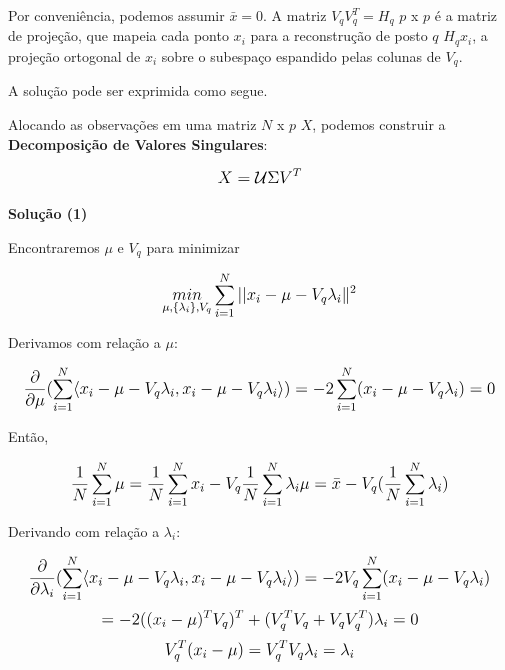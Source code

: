 \documentclass{article}
\begin{document}
Por conveniência, podemos assumir $\bar{x} = 0 $. A matriz $V_q V_q^T = H_q$ $p$ x $p$ é a matriz de projeção, que mapeia cada ponto $x_i$ para a reconstrução de posto $q$ $H_q x_i$, a projeção ortogonal de $x_i$ sobre o subespaço espandido pelas colunas de $V_q$.

A solução pode ser exprimida como segue.

Alocando as observações em uma matriz $N$ x $p$ $X$, podemos construir a \textbf{Decomposição de Valores Singulares}:

\begin{equation}
\mathlarger{
X = \mathcal{U} \Sigma V^T
}
\end{equation}

\pagebreak
\textbf{Solução (1)}

Encontraremos $\mu$ e $V_q$ para minimizar

\begin{equation}
\mathlarger{
\underset{\mu, \{ \lambda_i \}, V_q}{min} \sum_{i=1}^{N} || x_i - \mu - V_q \lambda_i \|^2
}
\end{equation}

Derivamos com relação a $\mu$:

\begin{equation}
\mathlarger{
\frac{\partial}{\partial \mu}(\sum_{i=1}^{N} \langle x_i - \mu - V_q\lambda_i, x_i - \mu - V_q\lambda_i \rangle) = -2 \sum_{i=1}^{N}(x_i - \mu - V_q\lambda_i) = 0
}
\end{equation}

Então,

\begin{equation}
\mathlarger{
\frac{1}{N}\sum_{i=1}^{N} \mu = \frac{1}{N}\sum_{i=1}^{N} x_i - V_q \frac{1}{N}\sum_{i=1}^{N} \lambda_i \\
\mu = \bar{x} - V_q (\frac{1}{N} \sum_{i=1}^N \lambda_i)
}
\end{equation}

Derivando com relação a $\lambda_i$:

\begin{equation}
\mathlarger{
\frac{\partial}{\partial \lambda_i} (\sum_{i=1}^{N} \langle x_i - \mu - V_q\lambda_i, x_i - \mu - V_q\lambda_i \rangle) = - 2V_q \sum_{i=1}^N ( x_i - \mu - V_q \lambda_i)
}
\end{equation}
\begin{equation}
\mathlarger{
= -2((x_i - \mu)^T V_q)^T + (V_q^T V_q + V_q V_q^T) \lambda_i = 0 
}
\end{equation}
\begin{equation}
\mathlarger{
V_q^T (x_i - \mu) = V_q^T V_q \lambda_i = \lambda_i
}
\end{equation}
\end{document}
